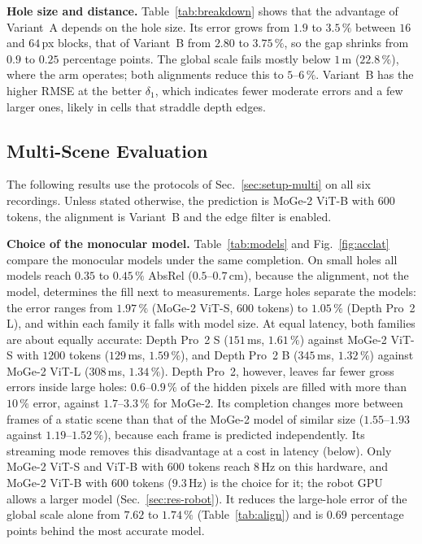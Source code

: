 \documentclass[conference]{IEEEtran}
\begin{document}
\textbf{Hole size and distance.} Table~\ref{tab:breakdown} shows that the
advantage of Variant~A depends on the hole size. Its error grows from
\(1.9\) to \(3.5\,\%\) between \(16\) and \(64\,\)px blocks, that of
Variant~B from \(2.80\) to \(3.75\,\%\), so the gap shrinks from \(0.9\) to
\(0.25\) percentage points. The global scale fails mostly below \(1\,\)m
(\(22.8\,\%\)), where the arm operates; both alignments reduce this to
\(5\)--\(6\,\%\). Variant~B has the higher RMSE at the better \(\delta_1\),
which indicates fewer moderate errors and a few larger ones, likely in cells
that straddle depth edges.

\subsection{Multi-Scene Evaluation}
\label{sec:res-multi}

The following results use the protocols of Sec.~\ref{sec:setup-multi} on all
six recordings. Unless stated otherwise, the prediction is MoGe-2 ViT-B with
\(600\) tokens, the alignment is Variant~B and the edge filter is enabled.

\textbf{Choice of the monocular model.}
\label{sec:res-model}
Table~\ref{tab:models} and Fig.~\ref{fig:acclat} compare the monocular models
under the same completion. On small holes all models reach \(0.35\) to
\(0.45\,\%\) AbsRel (\(0.5\)--\(0.7\,\)cm), because the alignment, not the model,
determines the fill next to measurements. Large holes separate the models: the
error ranges from \(1.97\,\%\) (MoGe-2 ViT-S, \(600\) tokens) to \(1.05\,\%\)
(Depth Pro~2 L), and within each family it falls with model size. At equal
latency, both families are about equally accurate: Depth Pro~2 S (\(151\,\)ms,
\(1.61\,\%\)) against MoGe-2 ViT-S with \(1200\) tokens (\(129\,\)ms,
\(1.59\,\%\)), and Depth Pro~2 B (\(345\,\)ms, \(1.32\,\%\)) against MoGe-2 ViT-L
(\(308\,\)ms, \(1.34\,\%\)). Depth Pro~2, however, leaves far fewer gross errors
inside large holes: \(0.6\)--\(0.9\,\%\) of the hidden pixels are filled with
more than \(10\,\%\) error, against \(1.7\)--\(3.3\,\%\) for MoGe-2. Its completion
changes more between frames of a static scene than that of the MoGe-2 model of
similar size (\(1.55\)--\(1.93\) against \(1.19\)--\(1.52\,\%\)), because each
frame is predicted independently. Its streaming mode removes this disadvantage at
a cost in latency (below). Only MoGe-2 ViT-S and ViT-B with \(600\) tokens reach \(8\,\)Hz on
this hardware, and MoGe-2 ViT-B with \(600\) tokens (\(9.3\,\)Hz) is the choice
for it; the robot GPU allows a larger model (Sec.~\ref{sec:res-robot}).
It reduces the large-hole error of the global scale alone from \(7.62\) to
\(1.74\,\%\) (Table~\ref{tab:align}) and is \(0.69\) percentage points behind
the most accurate model.
\end{document}
